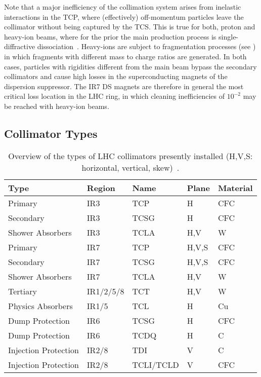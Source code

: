 Note that a major inefficiency of the collimation system arises from inelastic interactions in the TCP, where (effectively) off-momentum particles leave the collimator without being captured by the TCS. This is true for both, proton and heavy-ion beams, where for the prior the main production process is single-diffractive dissociation~\cite{ipac10:TUPEB080}. Heavy-ions are subject to fragmentation processes (see ) in which fragments with different mass to charge ratios are generated. In both cases, particles with rigidities different from the main beam bypass the secondary collimators and cause high losses in the superconducting magnets of the dispersion suppressor. The IR7 DS magnets are therefore in general the most critical loss location in the LHC ring, in which cleaning inefficiencies of $10^{-2}$ may be reached with heavy-ion beams.


\subsection{Collimator Types} \label{chap:collimator_types}
%
\begin{table}[htbp]
\centering
\caption{Overview of the types of LHC collimators presently installed (H,V,S: horizontal, vertical, skew)~\cite{}.}
\label{tab:ctypes}
\begin{tabular}{lllll}
Type                 & Region    & Name      & Plane & Material \\ \toprule
Primary              & IR3       & TCP       & H     & CFC      \\
Secondary            & IR3       & TCSG      & H     & CFC      \\
Shower Absorbers     & IR3       & TCLA      & H,V   & W        \\ \midrule
Primary              & IR7       & TCP       & H,V,S & CFC      \\
Secondary            & IR7       & TCSG      & H,V,S & CFC      \\
Shower Absorbers     & IR7       & TCLA      & H,V   & W        \\ \midrule
Tertiary             & IR1/2/5/8 & TCT       & H,V   & W        \\
Physics Absorbers    & IR1/5     & TCL       & H     & Cu       \\ \midrule
Dump Protection      & IR6       & TCSG      & H     & CFC      \\
Dump Protection      & IR6       & TCDQ      & H     & C        \\ \midrule
Injection Protection & IR2/8     & TDI       & V     & C        \\
Injection Protection & IR2/8     & TCLI/TCLD & V     & CFC      \\ \bottomrule
\end{tabular}
\end{table}

